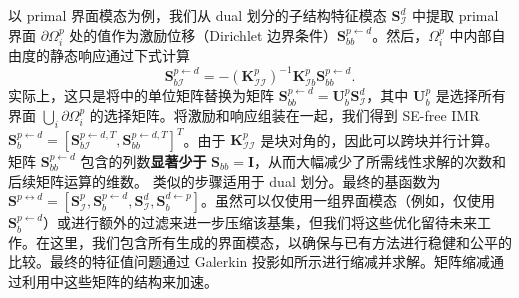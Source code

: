 以 primal 界面模态为例，我们从 dual 划分的子结构特征模态 $\mathbf{S}_{\mathcal{I}}^d$ 中提取 primal 界面 $\partial \Omega_i^p$ 处的值作为激励位移（Dirichlet 边界条件）$\mathbf{S}_{bb}^{p\leftarrow d}$。然后，$\Omega_i^p$ 中内部自由度的静态响应通过下式计算
\begin{equation}
  \mathbf{S}_{b\mathcal{I}}^{p\leftarrow d} = -
  (\mathbf{K}_{\mathcal{I}\mathcal{I}}^p)^{-1} \mathbf{K}_{\mathcal{I}b}^p
  \mathbf{S}_{bb}^{p\leftarrow d}.
  \label{eq:ours-response-solution}
\end{equation}
实际上，这只是将中的单位矩阵替换为矩阵 $\mathbf{S}_{bb}^{p \leftarrow d} = \mathbf{U}_b^p \mathbf{S}_{\mathcal{I}}^d$，其中 $\mathbf{U}_b^p$ 是选择所有界面 $\bigcup_i \partial \Omega_i^p$ 的选择矩阵。将激励和响应组装在一起，我们得到 SE-free IMR $\mathbf{S}_b^{p\leftarrow d}= [\mathbf{S}_{b\mathcal{I}}^{p\leftarrow d, T}, \mathbf{S}_{bb}^{p\leftarrow d,T}]^T$。由于 $\mathbf{K}^p_{\mathcal{II}}$ 是块对角的，因此可以跨块并行计算。\textcolor{ExplainConclusion}{矩阵 $\mathbf{S}_{bb}^{p \leftarrow d}$ 包含的列数\textbf{显著少于} $\mathbf{S}_{bb}=\mathbf{I}$，从而大幅减少了所需线性求解的次数和后续矩阵运算的维数。} 类似的步骤适用于 dual 划分。最终的基函数为 $\mathbf{S}^{p\leftrightarrow d}=[\mathbf{S}^p_{\mathcal{I}}, \mathbf{S}_{b}^{p\leftarrow d}, \mathbf{S}^d_{\mathcal{I}},\mathbf{S}_{b}^{d\leftarrow p} ]$。虽然可以仅使用一组界面模态（例如，仅使用 $\mathbf{S}_{b}^{p\leftarrow d}$）或进行额外的过滤来进一步压缩该基集，但我们将这些优化留待未来工作。在这里，我们包含所有生成的界面模态，以确保与已有方法进行稳健和公平的比较。最终的特征值问题通过 Galerkin 投影如所示进行缩减并求解。矩阵缩减通过利用中这些矩阵的结构来加速。
